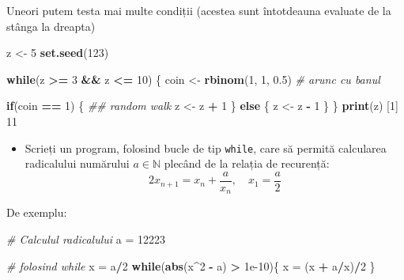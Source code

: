 \documentclass[]{article}
\newenvironment{Shaded}{\begin{snugshade}}{\end{snugshade}}
\newcommand{\CommentTok}[1]{\textcolor[rgb]{0.56,0.35,0.01}{\textit{#1}}}
\newcommand{\ControlFlowTok}[1]{\textcolor[rgb]{0.13,0.29,0.53}{\textbf{#1}}}
\newcommand{\DecValTok}[1]{\textcolor[rgb]{0.00,0.00,0.81}{#1}}
\newcommand{\FloatTok}[1]{\textcolor[rgb]{0.00,0.00,0.81}{#1}}
\newcommand{\KeywordTok}[1]{\textcolor[rgb]{0.13,0.29,0.53}{\textbf{#1}}}
\newcommand{\NormalTok}[1]{#1}
\newcommand{\OperatorTok}[1]{\textcolor[rgb]{0.81,0.36,0.00}{\textbf{#1}}}
\newcommand{\StringTok}[1]{\textcolor[rgb]{0.31,0.60,0.02}{#1}}
\newenvironment{frshaded*}{%
  \def\FrameCommand{\fboxrule=\FrameRule\fboxsep=\FrameSep \fcolorbox{framecolor}{shadecolor1}}%
  \MakeFramed {\advance\hsize-\width \FrameRestore}}%
{\endMakeFramed}
\newenvironment{rmdblock}[1]
  {\begin{frshaded*}
  \begin{itemize}
  \renewcommand{\labelitemi}{
    \raisebox{-.7\height}[0pt][0pt]{
      {\setkeys{Gin}{width=2em,keepaspectratio}\texttt{[image: images/icons/\#1]}}
    }
  }
  \item
  }
  {
  \end{itemize}
  \end{frshaded*}
  }
\newenvironment{rmdexercise}
  {\begin{rmdblock}{exercise}}
  {\end{rmdblock}}
\begin{document}
Uneori putem testa mai multe condiții (acestea sunt întotdeauna evaluate
de la stânga la dreapta)

\begin{Shaded}
\begin{Highlighting}[]
\NormalTok{z <-}\StringTok{ }\DecValTok{5}
\KeywordTok{set.seed}\NormalTok{(}\DecValTok{123}\NormalTok{)}

\ControlFlowTok{while}\NormalTok{(z }\OperatorTok{>=}\StringTok{ }\DecValTok{3} \OperatorTok{&&}\StringTok{ }\NormalTok{z }\OperatorTok{<=}\StringTok{ }\DecValTok{10}\NormalTok{) \{}
\NormalTok{        coin <-}\StringTok{ }\KeywordTok{rbinom}\NormalTok{(}\DecValTok{1}\NormalTok{, }\DecValTok{1}\NormalTok{, }\FloatTok{0.5}\NormalTok{) }\CommentTok{# arunc cu banul}
        
        \ControlFlowTok{if}\NormalTok{(coin }\OperatorTok{==}\StringTok{ }\DecValTok{1}\NormalTok{) \{  }\CommentTok{## random walk}
\NormalTok{                z <-}\StringTok{ }\NormalTok{z }\OperatorTok{+}\StringTok{ }\DecValTok{1}
\NormalTok{        \} }\ControlFlowTok{else}\NormalTok{ \{}
\NormalTok{                z <-}\StringTok{ }\NormalTok{z }\OperatorTok{-}\StringTok{ }\DecValTok{1}
\NormalTok{        \} }
\NormalTok{\}}
\KeywordTok{print}\NormalTok{(z)}
\NormalTok{[}\DecValTok{1}\NormalTok{] }\DecValTok{11}
\end{Highlighting}
\end{Shaded}

\begin{rmdexercise}
Scrieți un program, folosind bucle de tip \texttt{while}, care să
permită calcularea radicalului numărului \(a\in\mathbb{N}\) plecând de
la relația de recurență: \[
  2x_{n+1} = x_n + \frac{a}{x_n},\quad x_1 = \frac{a}{2}
\]
\end{rmdexercise}

De exemplu:

\begin{Shaded}
\begin{Highlighting}[]
\CommentTok{# Calculul radicalului}
\NormalTok{a =}\StringTok{ }\DecValTok{12223}

\CommentTok{# folosind while}
\NormalTok{x =}\StringTok{ }\NormalTok{a}\OperatorTok{/}\DecValTok{2}
\ControlFlowTok{while}\NormalTok{(}\KeywordTok{abs}\NormalTok{(x}\OperatorTok{^}\DecValTok{2} \OperatorTok{-}\StringTok{ }\NormalTok{a) }\OperatorTok{>}\StringTok{ }\FloatTok{1e-10}\NormalTok{)\{}
\NormalTok{  x =}\StringTok{ }\NormalTok{(x }\OperatorTok{+}\StringTok{ }\NormalTok{a}\OperatorTok{/}\NormalTok{x)}\OperatorTok{/}\DecValTok{2}
\NormalTok{\}}
\end{Highlighting}
\end{Shaded}
\end{document}
